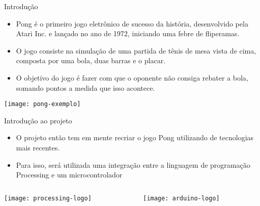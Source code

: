 
\begin{frame}[t]{Introdução} 
    \transdissolve[duration=0.5]

  	\begin{itemize}
        \item  Pong é o primeiro jogo eletrônico de sucesso da história, desenvolvido pela Atari Inc. e lançado no ano de 1972, iniciando uma febre de fliperamas.
        \item O jogo consiste na simulação de uma partida de tênis de mesa vista de cima, composta por uma bola, duas barras e o placar.
        \item O objetivo do jogo é fazer com que o oponente não consiga rebater a bola, somando pontos a medida que isso acontece.
    \end{itemize}
\vspace{0.3cm}
	\centering
	\texttt{[image: pong-exemplo]}    
          
\end{frame}
\begin{frame}[c]{Introdução ao projeto}
 \transdissolve[duration=0.5]
 
\begin{itemize}
        \item  O projeto então tem em mente recriar o jogo Pong utilizando de tecnologias mais recentes.
        \item Para isso, será utilizada uma integração entre a linguagem de programação Processing e um microcontrolador
    \end{itemize}
\vspace{1cm}

\begin{columns}
	\begin{column}{0.2\textwidth}
        	\texttt{[image: processing-logo]} 
	\end{column}
		\begin{column}{0.2\textwidth}
		\centering
       	\texttt{[image: arduino-logo]} 
	\end{column}
\end{columns}

\end{frame}
